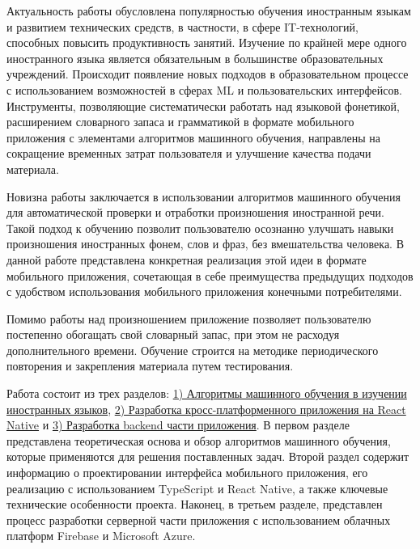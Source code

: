 Актуальность работы обусловлена популярностью обучения иностранным языкам и развитием технических средств, в частности, в сфере IT-технологий, способных повысить продуктивность занятий. Изучение по крайней мере одного иностранного языка является обязательным в большинстве образовательных учреждений. Происходит появление новых подходов в образовательном процессе с использованием возможностей в сферах ML и пользовательских интерфейсов. Инструменты, позволяющие систематически работать над языковой фонетикой, расширением словарного запаса и грамматикой в формате мобильного приложения с элементами алгоритмов машинного обучения, направлены на сокращение временных затрат пользователя и улучшение качества подачи материала.

Новизна работы заключается в использовании алгоритмов машинного обучения для автоматической проверки и отработки произношения иностранной речи. Такой подход к обучению позволит пользователю осознанно улучшать навыки произношения иностранных фонем, слов и фраз, без вмешательства человека. В данной работе представлена конкретная реализация этой идеи в формате мобильного приложения, сочетающая в себе преимущества предыдущих подходов с удобством использования мобильного приложения конечными потребителями.

Помимо работы над произношением приложение позволяет пользователю постепенно обогащать свой словарный запас, при этом не расходуя дополнительного времени. Обучение строится на методике периодического повторения и закрепления материала путем тестирования.

Работа состоит из трех разделов: \hyperref[sec:section-1]{1) Алгоритмы машинного обучения в изучении иностранных языков}, \hyperref[sec:section-2]{2) Разработка кросс-платформенного приложения на React Native} и \hyperref[sec:section-3]{3) Разработка backend части приложения}. В первом разделе представлена теоретическая основа и обзор алгоритмов машинного обучения, которые применяются для решения поставленных задач. Второй раздел содержит информацию о проектировании интерфейса мобильного приложения, его реализацию с использованием TypeScript и React Native, а также ключевые технические особенности проекта. Наконец, в третьем разделе, представлен процесс разработки серверной части приложения с использованием облачных платформ Firebase и Microsoft Azure.
